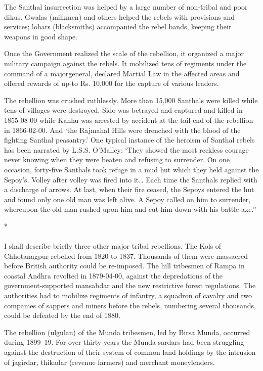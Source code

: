 The Santhal insurrection was helped by a large number of non-tribal and poor dikus. Gwalas (milkmen) and others helped the rebels with provisions and services; lohars (blacksmiths) accompanied the rebel bands, keeping their weapons in good shape.

Once the Government realized the scale of the rebellion, it organized a major military campaign against the rebels. It mobilized tens of regiments under the command of a major­general, declared Martial Law in the affected areas and offered rewards of up-to Rs. 10,000 for the capture of various leaders.

The rebellion was crushed ruthlessly. More than 15,000 Santhals were killed while tens of villages were destroyed. Sido was betrayed and captured and killed in 1855-08-00 while Kanhu was arrested by accident at the tail-end of the rebellion in 1866-02-00. And `the Rajmahal Hills were drenched with the blood of the fighting Santhal peasantry.' One typical instance of the heroism of Santhal rebels has been narrated by L.S.S. O'Malley: `They showed the most reckless courage never knowing when they were beaten and refusing to surrender. On one occasion, forty-five Santhals took refuge in a mud hut which they held against the Sepoy's. Volley after volley was fired into it… Each time the Santhals replied with a discharge of arrows. At last, when their fire ceased, the Sepoys entered the hut and found only one old man was left alive. A Sepoy called on him to surrender, whereupon the old man rushed upon him and cut him down with his battle axe.''

\begin{center}*\end{center}

\paragraph*{}
I shall describe briefly three other major tribal rebellions. The Kols of Chhotanagpur rebelled from 1820 to 1837. Thousands of them were massacred before British authority could be re-imposed. The hill tribesmen of Rampa in coastal Andhra revolted in 1879-04-00, against the depredations of the government-supported mansabdar and the new restrictive forest regulations. The authorities had to mobilize regiments of infantry, a squadron of cavalry and two companies of sappers and miners before the rebels, numbering several thousands, could be defeated by the end of 1880.

The rebellion (ulgulan) of the Munda tribesmen, led by Birsa Munda, occurred during 1899--19. For over thirty years the Munda sardars had been struggling against the destruction of their system of common land holdings by the intrusion of jagirdar, thikadar (revenue farmers) and merchant moneylenders.


